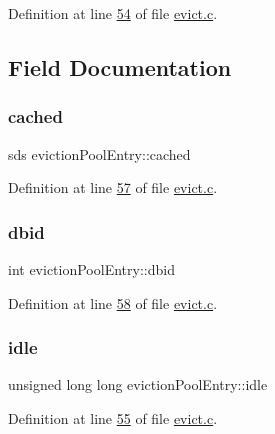 Definition at line \hyperlink{evict_8c_source_l00054}{54} of file \hyperlink{evict_8c_source}{evict.\+c}.



\subsection{Field Documentation}
\mbox{\label{structevictionPoolEntry_a57611fdc5a655a808616731b051dd62c}} 
\subsubsection{\texorpdfstring{cached}{cached}}
{\footnotesize\ttfamily sds eviction\+Pool\+Entry\+::cached}



Definition at line \hyperlink{evict_8c_source_l00057}{57} of file \hyperlink{evict_8c_source}{evict.\+c}.

\mbox{\label{structevictionPoolEntry_a4d28f9d176d4047641f2153b0f7af294}} 
\subsubsection{\texorpdfstring{dbid}{dbid}}
{\footnotesize\ttfamily int eviction\+Pool\+Entry\+::dbid}



Definition at line \hyperlink{evict_8c_source_l00058}{58} of file \hyperlink{evict_8c_source}{evict.\+c}.

\mbox{\label{structevictionPoolEntry_a1684112289f68796969533d55668564f}} 
\subsubsection{\texorpdfstring{idle}{idle}}
{\footnotesize\ttfamily unsigned long long eviction\+Pool\+Entry\+::idle}



Definition at line \hyperlink{evict_8c_source_l00055}{55} of file \hyperlink{evict_8c_source}{evict.\+c}.

